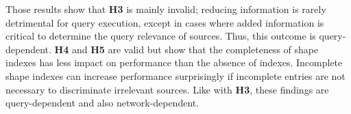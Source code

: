 Those results show that \textbf{H3} is mainly invalid; reducing information is rarely detrimental for query execution, except in cases where added information is critical to determine the query relevance of sources.
Thus, this outcome is query-dependent.
\textbf{H4} and \textbf{H5} are valid but show that the completeness of shape indexes has less impact on performance than the absence of indexes.
Incomplete shape indexes can increase performance surprisingly if incomplete entries are not necessary to discriminate irrelevant sources. 
Like with \textbf{H3}, these findings are query-dependent and also network-dependent.

